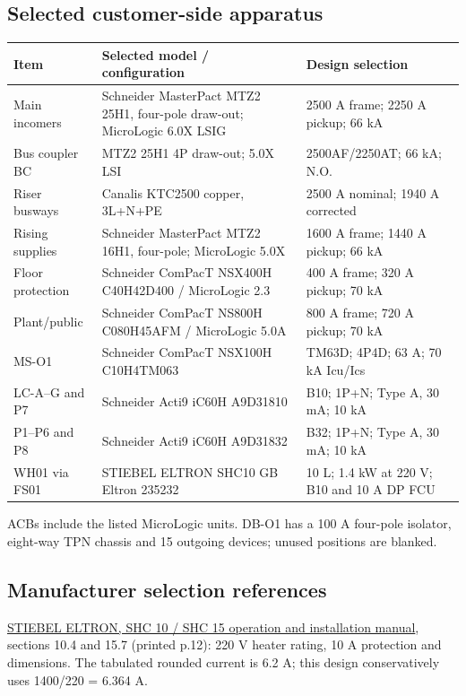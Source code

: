 \subsection*{Selected customer-side apparatus}
\begingroup\small\renewcommand{\arraystretch}{1.0}
\begin{longtable}{p{.19\linewidth}p{.42\linewidth}p{.31\linewidth}}\toprule
Item & Selected model / configuration & Design selection\\\midrule\endhead
Main incomers & Schneider MasterPact MTZ2 25H1, four-pole draw-out; MicroLogic 6.0X LSIG & 2500 A frame; 2250 A pickup; 66 kA\\
Bus coupler BC & MTZ2 25H1 4P draw-out; 5.0X LSI & 2500AF/2250AT; 66 kA; N.O.\\
Riser busways & Canalis KTC2500 copper, 3L+N+PE & 2500 A nominal; 1940 A corrected\\
Rising supplies & Schneider MasterPact MTZ2 16H1, four-pole; MicroLogic 5.0X & 1600 A frame; 1440 A pickup; 66 kA\\
Floor protection & Schneider ComPacT NSX400H C40H42D400 / MicroLogic 2.3 & 400 A frame; 320 A pickup; 70 kA\\
Plant/public & Schneider ComPacT NS800H C080H45AFM / MicroLogic 5.0A & 800 A frame; 720 A pickup; 70 kA\\
MS-O1 & Schneider ComPacT NSX100H C10H4TM063 & TM63D; 4P4D; 63 A; 70 kA Icu/Ics\\
LC-A--G and P7 & Schneider Acti9 iC60H A9D31810 & B10; 1P+N; Type A, 30 mA; 10 kA\\
P1--P6 and P8 & Schneider Acti9 iC60H A9D31832 & B32; 1P+N; Type A, 30 mA; 10 kA\\
WH01 via FS01 & STIEBEL ELTRON SHC10 GB Eltron 235232 & 10 L; 1.4 kW at 220 V; B10 and 10 A DP FCU\\
\bottomrule\end{longtable}
\endgroup
ACBs include the listed MicroLogic units. DB-O1 has a 100 A four-pole isolator, eight-way TPN chassis and 15 outgoing devices; unused positions are blanked.

\subsection*{Manufacturer selection references}
\href{https://www.stiebel-eltron.com/content/dam/ste/cdbassets/current/bedienungs-_u_installationsanleitungen/instructionandinstallationmanual_doc-00060782.pdf}{STIEBEL ELTRON, SHC 10 / SHC 15 operation and installation manual}, sections 10.4 and 15.7 (printed p.12): 220 V heater rating, 10 A protection and dimensions. The tabulated rounded current is 6.2 A; this design conservatively uses 1400/220 = 6.364 A.

